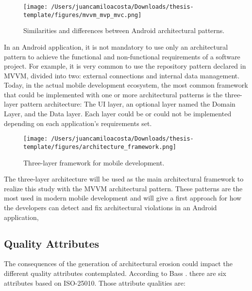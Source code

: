 \begin{figure}
    \centering
    \texttt{[image: /Users/juancamiloacosta/Downloads/thesis-template/figures/mvvm\_mvp\_mvc.png]}
    \caption{Similarities and differences between Android architectural patterns. \citet{} }
    \label{fig:concept-map}
\end{figure}


In an Android application, it is not mandatory to use only an architectural pattern to achieve the functional and non-functional requirements of a software project. For example, it is very common to use the repository pattern declared in MVVM, divided into two: external connections and internal data management. Today, in the actual mobile development ecosystem, the most common framework that could be implemented with one or more architectural patterns is the three-layer pattern architecture: The UI layer, an optional layer named the Domain Layer, and the Data layer. Each layer could be or could not be implemented depending on each application's requirements set. 

\begin{figure}
    \centering
    \texttt{[image: /Users/juancamiloacosta/Downloads/thesis-template/figures/architecture\_framework.png]}
    \caption{Three-layer framework for mobile development. \citet{} }
    \label{fig:concept-map}
\end{figure}

The three-layer architecture will be used as the main architectural framework to realize this study with the MVVM architectural pattern. These patterns are the most used in modern mobile development and will give a first approach for how the developers can detect and fix architectural violations in an Android application,

\subsection{Quality Attributes}
The consequences of the generation of architectural erosion could impact the different quality attributes contemplated. According to Bass \citet{bass-architecture-book}. there are six attributes based on ISO-25010. Those attribute qualities are:

